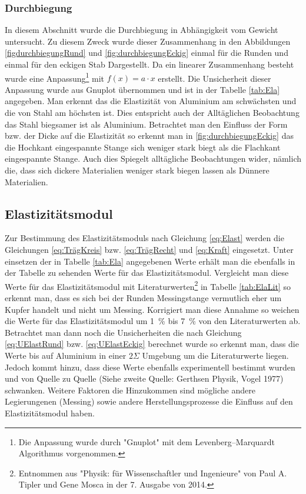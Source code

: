 \subsubsection*{Durchbiegung}
In diesem Abschnitt wurde die Durchbiegung in Abhängigkeit vom Gewicht untersucht. Zu diesem Zweck wurde dieser Zusammenhang in den Abbildungen \ref{figdurchbiegungRund} und \ref{fig:durchbiegungEckig} einmal für die Runden und einmal für den eckigen Stab Dargestellt. Da ein linearer Zusammenhang besteht wurde eine Anpassung\footnote{Die Anpassung wurde durch "Gnuplot" mit dem Levenberg–Marquardt Algorithmus vorgenommen.  }  mit $f(x)=a \cdot x$ erstellt. Die Unsicherheit dieser Anpassung wurde aus Gnuplot übernommen und ist in der Tabelle \ref{tab:Ela} angegeben.
Man erkennt das die Elastizität von Aluminium am schwächsten und die von Stahl am höchsten ist. Dies entspricht auch der Alltäglichen Beobachtung das Stahl biegsamer ist als Aluminium.
Betrachtet man den Einfluss der Form bzw. der Dicke auf die Elastizität so erkennt man in \ref{fig:durchbiegungEckig} das die Hochkant eingespannte Stange sich weniger stark biegt als die Flachkant eingespannte Stange. Auch dies Spiegelt alltägliche Beobachtungen wider, nämlich die, dass sich dickere Materialien weniger stark biegen lassen als Dünnere Materialien.

\subsection{Elastizitätsmodul}

Zur Bestimmung des Elastizitätsmoduls nach Gleichung \ref{eq:Elast} werden die Gleichungen \ref{eq:TrägKreis} bzw. \ref{eq:TrägRecht} und \ref{eq:Kraft} eingesetzt. Unter einsetzen der in Tabelle \ref{tab:Ela} angegebenen Werte erhält man die ebenfalls in der Tabelle zu sehenden Werte für das Elastizitätsmodul.
Vergleicht man diese Werte für das Elastizitätsmodul mit Literaturwerten\footnote{Entnommen aus "Physik: für Wissenschaftler und Ingenieure" von Paul A. Tipler und Gene Mosca in der 7. Ausgabe von 2014.} in Tabelle \ref{tab:ElaLit} so erkennt man, dass es sich bei der Runden Messingstange vermutlich eher um Kupfer handelt und nicht um Messing. Korrigiert man diese Annahme so weichen die Werte für das Elastizitätsmodul um \SI{1}{\percent} bis \SI{7}{\percent} von den Literaturwerten ab. Betrachtet man dann noch die Unsicherheiten die nach Gleichung \ref{eq:UElastRund} bzw. \ref{eq:UElastEckig} berechnet wurde so erkennt man, dass die Werte bis auf Aluminium in einer $2\Sigma$ Umgebung um die Literaturwerte liegen. Jedoch kommt hinzu, dass diese Werte ebenfalls experimentell bestimmt wurden und von Quelle zu Quelle (Siehe zweite Quelle: Gerthsen Physik, Vogel 1977) schwanken. Weitere Faktoren die Hinzukommen sind mögliche andere Legierungenen (Messing) sowie andere Herstellungsprozesse die Einfluss auf den Elastizitätsmodul haben. 

